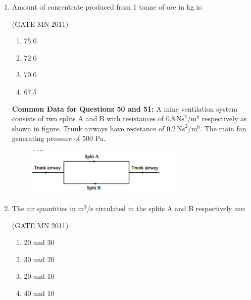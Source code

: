 \documentclass[journal]{IEEEtran}
\begin{document}
\begin{enumerate}
\begin{multicols}{4}
\begin{enumerate}
\item 13.5  
\item 14.0  
\item 14.5  
\item 15.0  
\end{enumerate}
\end{multicols}

\item Amount of concentrate produced from 1 tonne of ore in kg is: 

	\hfill(GATE MN 2011)

\begin{multicols}{4}
\begin{enumerate}
\item 75.0  
\item 72.0  
\item 70.0  
\item 67.5  
\end{enumerate}
\end{multicols}

\textbf{Common Data for Questions 50 and 51:} A mine ventilation system consists of two splits A and B with resistances of $0.8 \, \text{Ns}^2/\text{m}^8$ respectively as shown in figure. Trunk airways have resistance of $0.2 \, \text{Ns}^2/\text{m}^8$. The main fan generating pressure of 500 Pa.

    \begin{figure}[H]
    \centering
        \includegraphics[width=0.7\textwidth]{Screenshot_2025_0816_115916.png}
	    \caption{}
    \label{fig:Q50}
    \end{figure}

\item The air quantities in m$^3$/s circulated in the splits A and B respectively are:  

	\hfill(GATE MN 2011)

\begin{multicols}{4}
\begin{enumerate}
\item 20 and 30  
\item 30 and 20  
\item 20 and 10  
\item 40 and 10  
\end{enumerate}
\end{multicols}


\end{enumerate}
\end{document}
